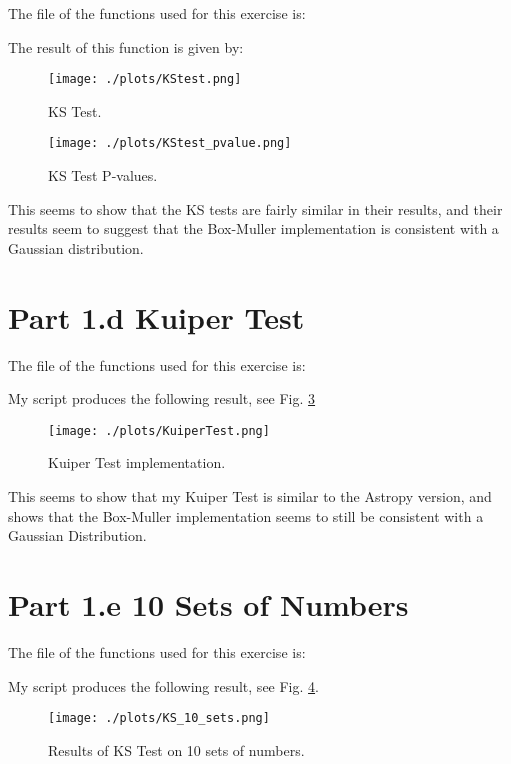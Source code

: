 The file of the functions used for this exercise is:



The result of this function is given by:

\begin{figure}[h!]
  \centering
  \texttt{[image: ./plots/KStest.png]}
  \caption{KS Test.}
  \label{fig:kstest}
\end{figure}


\begin{figure}[h!]
  \centering
  \texttt{[image: ./plots/KStest\_pvalue.png]}
  \caption{KS Test P-values.}
  \label{fig:kstest}
\end{figure}

This seems to show that the KS tests are fairly similar in their results, and their results seem to
suggest that the Box-Muller implementation is consistent with a Gaussian distribution.


\section{Part 1.d Kuiper Test}

The file of the functions used for this exercise is:



My script produces the following result, see Fig. \ref{fig:kuiperTest}

\begin{figure}[h!]
  \centering
  \texttt{[image: ./plots/KuiperTest.png]}
  \caption{Kuiper Test implementation.}
  \label{fig:kuiperTest}
\end{figure}

This seems to show that my Kuiper Test is similar to the Astropy version, and shows that
the Box-Muller implementation seems to still be consistent with a Gaussian Distribution.


\section{Part 1.e 10 Sets of Numbers}

The file of the functions used for this exercise is:



My script produces the following result, see Fig. \ref{fig:10_sets}.

\begin{figure}[h!]
  \centering
  \texttt{[image: ./plots/KS\_10\_sets.png]}
  \caption{Results of KS Test on 10 sets of numbers. }
  \label{fig:10_sets}
\end{figure}


